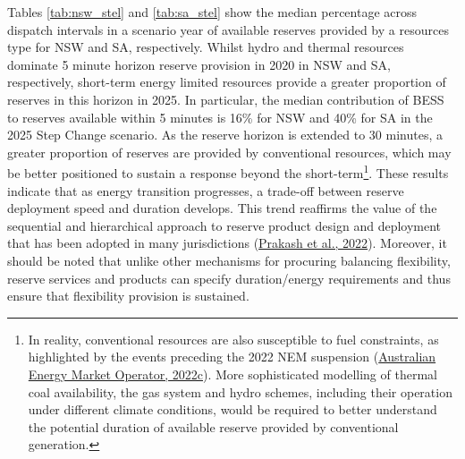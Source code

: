 \documentclass[12pt,a4paper,]{report}
\begin{document}
Tables \ref{tab:nsw_stel} and \ref{tab:sa_stel} show the median
percentage across dispatch intervals in a scenario year of available
reserves provided by a resources type for NSW and SA, respectively.
Whilst hydro and thermal resources dominate 5 minute horizon reserve
provision in 2020 in NSW and SA, respectively, short-term energy limited
resources provide a greater proportion of reserves in this horizon in
2025. In particular, the median contribution of BESS to reserves
available within 5 minutes is 16\% for NSW and 40\% for SA in the 2025
Step Change scenario. As the reserve horizon is extended to 30 minutes,
a greater proportion of reserves are provided by conventional resources,
which may be better positioned to sustain a response beyond the
short-term\footnote{In reality, conventional resources are also
  susceptible to fuel constraints, as highlighted by the events
  preceding the 2022 NEM suspension
  (\protect\hyperlink{ref-australianenergymarketoperatorNEMMarketSuspension2022}{Australian
  Energy Market Operator, 2022c}). More sophisticated modelling of
  thermal coal availability, the gas system and hydro schemes, including
  their operation under different climate conditions, would be required
  to better understand the potential duration of available reserve
  provided by conventional generation.}. These results indicate that as
energy transition progresses, a trade-off between reserve deployment
speed and duration develops. This trend reaffirms the value of the
sequential and hierarchical approach to reserve product design and
deployment that has been adopted in many jurisdictions
(\protect\hyperlink{ref-prakashInsightsDesigningEffective2022}{Prakash
et al., 2022}). Moreover, it should be noted that unlike other
mechanisms for procuring balancing flexibility, reserve services and
products can specify duration/energy requirements and thus ensure that
flexibility provision is sustained.
\end{document}
